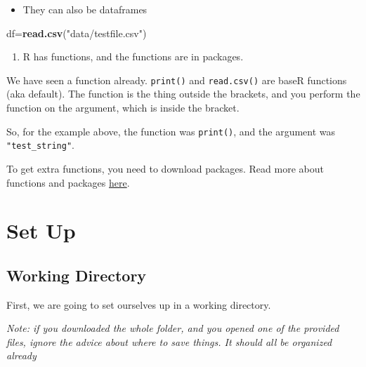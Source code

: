 \documentclass[
]{article}
\newenvironment{Shaded}{\begin{snugshade}}{\end{snugshade}}
\newcommand{\FunctionTok}[1]{\textcolor[rgb]{0.13,0.29,0.53}{\textbf{#1}}}
\newcommand{\NormalTok}[1]{#1}
\newcommand{\OtherTok}[1]{\textcolor[rgb]{0.56,0.35,0.01}{#1}}
\newcommand{\StringTok}[1]{\textcolor[rgb]{0.31,0.60,0.02}{#1}}
\providecommand{\tightlist}{%
  \setlength{\itemsep}{0pt}\setlength{\parskip}{0pt}}
\begin{document}
\begin{itemize}
\tightlist
\item
  They can also be dataframes
\end{itemize}

\begin{Shaded}
\begin{Highlighting}[]
\NormalTok{df}\OtherTok{=}\FunctionTok{read.csv}\NormalTok{(}\StringTok{"data/testfile.csv"}\NormalTok{)}
\end{Highlighting}
\end{Shaded}

\begin{enumerate}
\def\labelenumi{\arabic{enumi}.}
\setcounter{enumi}{2}
\tightlist
\item
  R has functions, and the functions are in packages.
\end{enumerate}

We have seen a function already. \texttt{print()} and
\texttt{read.csv()} are baseR functions (aka default). The function is
the thing outside the brackets, and you perform the function on the
argument, which is inside the bracket.

So, for the example above, the function was \texttt{print()}, and the
argument was \texttt{"test\_string"}.

To get extra functions, you need to download packages. Read more about
functions and packages
\href{https://bookdown.org/nana/intror/install-and-load-packages.html}{here}.

\section{Set Up}\label{set-up}

\subsection{Working Directory}\label{working-directory}

First, we are going to set ourselves up in a working directory.

\emph{Note: if you downloaded the whole folder, and you opened one of
the provided files, ignore the advice about where to save things. It
should all be organized already}
\end{document}
